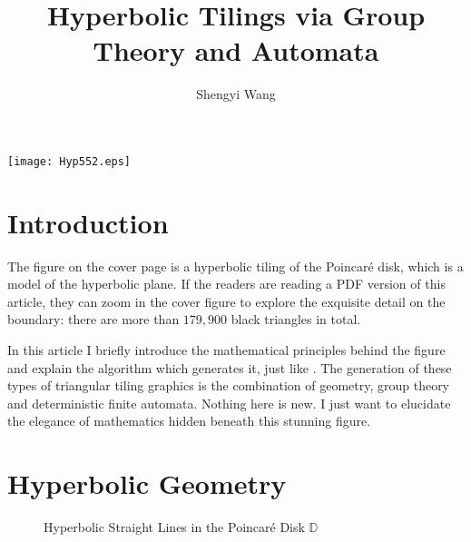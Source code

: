 \documentclass[12pt]{article}
\title{Hyperbolic Tilings via Group Theory and Automata}
\author{Shengyi Wang}
\begin{document}
\maketitle

\begin{center}
  \texttt{[image: Hyp552.eps]}
\end{center}

\section{Introduction}

The figure on the cover page is a hyperbolic tiling of the Poincar\'e
disk, which is a model of the hyperbolic plane. If the readers are
reading a PDF version of this article, they can zoom in the cover
figure to explore the exquisite detail on the boundary: there are more
than $179,900$ black triangles in total.

In this article I briefly introduce the mathematical principles behind
the figure and explain the algorithm which generates it, just like
\citep{silvio1992}. The generation of these types of triangular tiling
graphics is the combination of geometry, group theory and
deterministic finite automata. Nothing here is new. I just want to
elucidate the elegance of mathematics hidden beneath this stunning
figure.

\section{Hyperbolic Geometry}
\begin{figure}[htbp]
  \centering
  \caption{Hyperbolic Straight Lines in the Poincar\'e Disk $\mathbb{D}$}
  \label{fig:hyplines}
\end{figure}
\end{document}
